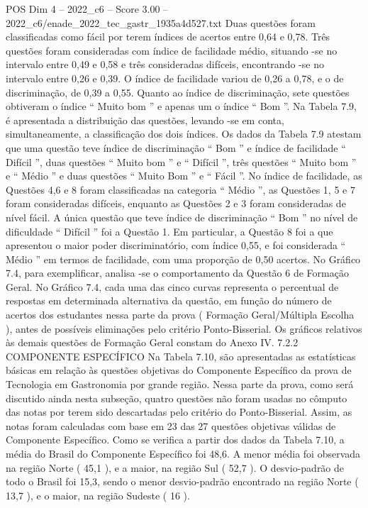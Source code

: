\begin{textsample}{POS Dim 4 – 2022\_c6 – Score 3.00 – 2022\_c6/enade\_2022\_tec\_gastr\_1935a4d527.txt}
Duas questões foram classificadas como fácil por terem índices de acertos entre 0,64 e 0,78.
Três questões foram consideradas com índice de facilidade médio, situando -se no intervalo entre 0,49 e 0,58 e três consideradas difíceis, encontrando -se no intervalo entre 0,26 e 0,39.
O índice de facilidade variou de 0,26 a 0,78, e o de discriminação, de 0,39 a 0,55.
Quanto ao índice de discriminação, sete questões obtiveram o índice “ Muito bom ” e apenas um o índice “ Bom ”.
Na Tabela 7.9, é apresentada a distribuição das questões, levando -se em conta, simultaneamente, a classificação dos dois índices.
Os dados da Tabela 7.9 atestam que uma questão teve índice de discriminação “ Bom ” e índice de facilidade “ Difícil ”, duas questões “ Muito bom ” e “ Difícil ”, três questões “ Muito bom ” e “ Médio ” e duas questões “ Muito Bom ” e “ Fácil ”.
No índice de facilidade, as Questões 4,6 e 8 foram classificadas na categoria “ Médio ”, as Questões 1, 5 e 7 foram consideradas difíceis, enquanto as Questões 2 e 3 foram consideradas de nível fácil.
A única questão que teve índice de discriminação “ Bom ” no nível de dificuldade “ Difícil ” foi a Questão 1.
Em particular, a Questão 8 foi a que apresentou o maior poder discriminatório, com índice 0,55, e foi considerada “ Médio ” em termos de facilidade, com uma proporção de 0,50 acertos.
No Gráfico 7.4, para exemplificar, analisa -se o comportamento da Questão 6 de Formação Geral.
No Gráfico 7.4, cada uma das cinco curvas representa o percentual de respostas em determinada alternativa da questão, em função do número de acertos dos estudantes nessa parte da prova ( Formação Geral/Múltipla Escolha ), antes de possíveis eliminações pelo critério Ponto-Bisserial.
Os gráficos relativos às demais questões de Formação Geral constam do Anexo IV. 7.2.2 COMPONENTE ESPECÍFICO Na Tabela 7.10, são apresentadas as estatísticas básicas em relação às questões objetivas do Componente Específico da prova de Tecnologia em Gastronomia por grande região.
Nessa parte da prova, como será discutido ainda nesta subseção, quatro questões não foram usadas no cômputo das notas por terem sido descartadas pelo critério do Ponto-Bisserial.
Assim, as notas foram calculadas com base em 23 das 27 questões objetivas válidas de Componente Específico.
Como se verifica a partir dos dados da Tabela 7.10, a média do Brasil do Componente Específico foi 48,6.
A menor média foi observada na região Norte ( 45,1 ), e a maior, na região Sul ( 52,7 ).
O desvio-padrão de todo o Brasil foi 15,3, sendo o menor desvio-padrão encontrado na região Norte ( 13,7 ), e o maior, na região Sudeste ( 16 ).

\end{textsample}
